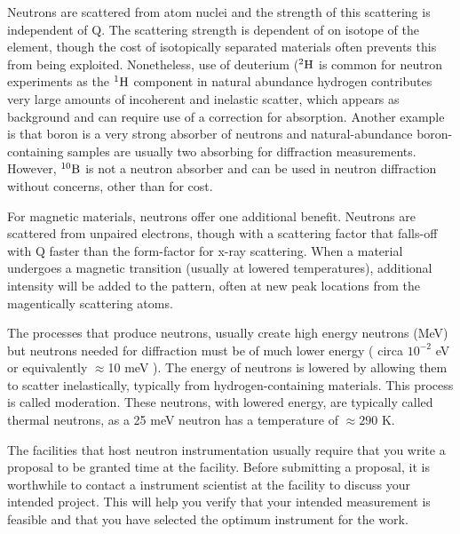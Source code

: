 Neutrons are scattered from atom nuclei and the strength of this scattering is independent of Q. The scattering strength is dependent of on isotope of the element, though the cost of isotopically separated materials often prevents this from being exploited. Nonetheless, use of deuterium (${}^2\rm{H}$ is common for neutron experiments as the ${}^1\rm{H}$ component in natural abundance hydrogen contributes very large amounts of incoherent and inelastic scatter, which appears as background and can require use of a correction for absorption. Another example is that boron is a very strong absorber of neutrons and natural-abundance boron-containing samples are usually two absorbing for diffraction measurements. However, ${}^{10}\rm{B}$ is not a neutron absorber and can be used in neutron diffraction without concerns, other than for cost. 

For magnetic materials, neutrons offer one additional benefit. Neutrons are scattered from unpaired electrons, though with a scattering factor that falls-off with Q faster than the form-factor for x-ray scattering. When a material undergoes a magnetic transition (usually at lowered temperatures), additional intensity will be added to the pattern, often at new peak locations from the magentically scattering atoms. 

The processes that produce neutrons, usually create high energy neutrons (MeV) but neutrons needed for diffraction must be of much lower energy ( circa $10^{-2}$ eV or equivalently $\approx$10 meV ). The energy of neutrons is lowered by allowing them to scatter inelastically, typically from hydrogen-containing materials. This process is called moderation. These neutrons, with lowered energy, are typically called thermal neutrons, as a 25 meV neutron has a temperature of $\approx 290$ K.

The facilities that host neutron instrumentation usually require that you write a proposal to be granted time at the facility. Before submitting a proposal, it is worthwhile to contact a instrument scientist at the facility to discuss your intended project. This will help you verify that your intended measurement is feasible and that you have selected the optimum instrument for the work. 

